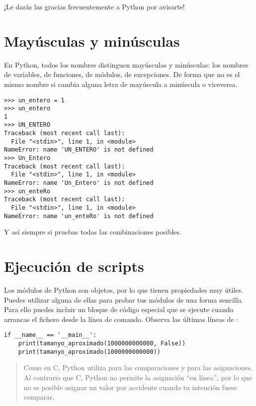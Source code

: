 ¡Le darás las gracias frecuentemente a Python por avisarte!

\section {Mayúsculas y minúsculas}

En Python, todos los nombres distinguen mayúsculas y minúsculas: los nombres de variables, de funciones, de módulos, de excepciones. De forma que no es el mismo nombre si cambia alguna letra de mayúscula a minúscula o viceversa.

\noindent\begin{minipage}{\textwidth}
\begin{lstlisting}[mathescape=True]
>>> un_entero = 1
>>> un_entero
1
>>> UN_ENTERO
Traceback (most recent call last):
  File "<stdin>", line 1, in <module>
NameError: name 'UN_ENTERO' is not defined
>>> Un_Entero
Traceback (most recent call last):
  File "<stdin>", line 1, in <module>
NameError: name 'Un_Entero' is not defined
>>> un_enteRo
Traceback (most recent call last):
  File "<stdin>", line 1, in <module>
NameError: name 'un_enteRo' is not defined
\end{lstlisting}
\end{minipage}

Y así siempre si pruebas todas las combinaciones posibles.

\section {Ejecución de scripts}


Los módulos de Python son objetos, por lo que tienen propiedades muy útiles. Puedes utilizar alguna de ellas para probar tus módulos de una forma sencilla. Para ello puedes incluir un bloque de código especial que se ejecute cuando arrancas el fichero desde la línea de comando. Observa las últimas líneas de :

\noindent\begin{minipage}{\textwidth}
\begin{lstlisting}[mathescape=True]
if __name__ == '__main__':
    print(tamanyo_aproximado(1000000000000, False))
    print(tamanyo_aproximado(1000000000000))
\end{lstlisting}
\end{minipage}

\begin{quote}
Como en C, Python utiliza \codigo{==} para las comparaciones y \codigo{=} para las asignaciones. Al contrario que C, Python no permite la asignación ``en línea'', por lo que no es posible asignar un valor por accidente cuando tu intención fuese comparar.
\end{quote}

